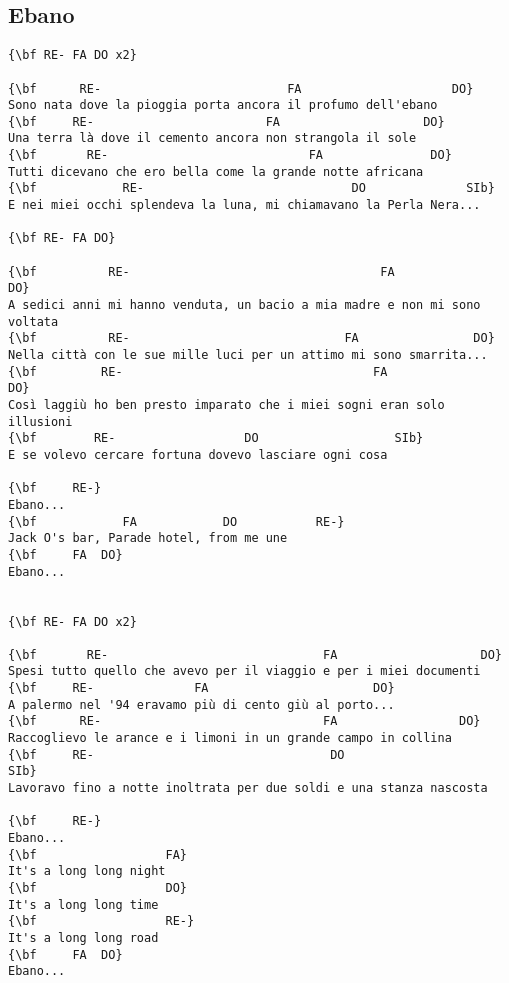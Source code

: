 \documentclass[a4paper]{article}
\begin{document}
\subsection{Ebano} %
\label{sub:Ebano}
\begin{Verbatim}[commandchars=\\\{\}]
{\bf RE- FA DO x2}

{\bf      RE-                          FA                     DO}
Sono nata dove la pioggia porta ancora il profumo dell'ebano
{\bf     RE-                        FA                    DO}
Una terra là dove il cemento ancora non strangola il sole
{\bf       RE-                            FA               DO}
Tutti dicevano che ero bella come la grande notte africana
{\bf            RE-                             DO              SIb}
E nei miei occhi splendeva la luna, mi chiamavano la Perla Nera...

{\bf RE- FA DO}

{\bf          RE-                                   FA                     DO}
A sedici anni mi hanno venduta, un bacio a mia madre e non mi sono voltata
{\bf          RE-                              FA                DO}
Nella città con le sue mille luci per un attimo mi sono smarrita...
{\bf         RE-                                   FA                  DO}
Così laggiù ho ben presto imparato che i miei sogni eran solo illusioni
{\bf        RE-                  DO                   SIb}
E se volevo cercare fortuna dovevo lasciare ogni cosa

{\bf     RE-}
Ebano...
{\bf            FA            DO           RE-}
Jack O's bar, Parade hotel, from me une
{\bf     FA  DO}
Ebano...


{\bf RE- FA DO x2}

{\bf       RE-                              FA                    DO}
Spesi tutto quello che avevo per il viaggio e per i miei documenti
{\bf     RE-              FA                       DO}
A palermo nel '94 eravamo più di cento giù al porto...
{\bf      RE-                               FA                 DO}
Raccoglievo le arance e i limoni in un grande campo in collina
{\bf     RE-                                 DO                    SIb}
Lavoravo fino a notte inoltrata per due soldi e una stanza nascosta

{\bf     RE-}
Ebano...
{\bf                  FA}
It's a long long night
{\bf                  DO}
It's a long long time
{\bf                  RE-}
It's a long long road
{\bf     FA  DO}
Ebano...


\end{Verbatim}
\end{document}
